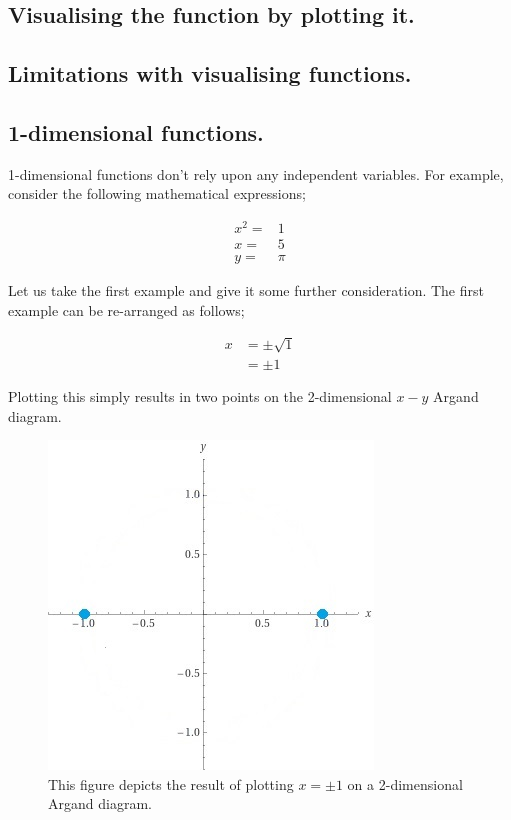 \documentclass{article}
\begin{document}
\subsection{Visualising the function by plotting it.}

\subsection{Limitations with visualising functions.}




\subsection{1-dimensional functions.}

1-dimensional functions don't rely upon any independent variables. For example, consider the following
mathematical expressions;

\begin{align*}
x^{2} =& 1 \\
x     =& 5 \\
y     =& \pi
\end{align*}

Let us take the first example and give it some further consideration. The first example can be re-arranged
as follows;

\begin{align*}
x &= \pm\sqrt{1} \\
  &= \pm1
\end{align*}

Plotting this simply results in two points on the 2-dimensional $x-y$ Argand diagram.

\begin{figure}
  \includegraphics[scale=1.5]{images/Plus_and_minus_one.jpg}
  \caption{This figure depicts the result of plotting $x = \pm1$ on a 2-dimensional Argand diagram.}
  \label{fig:Plus_and_minus_one}
\end{figure}
\end{document}
